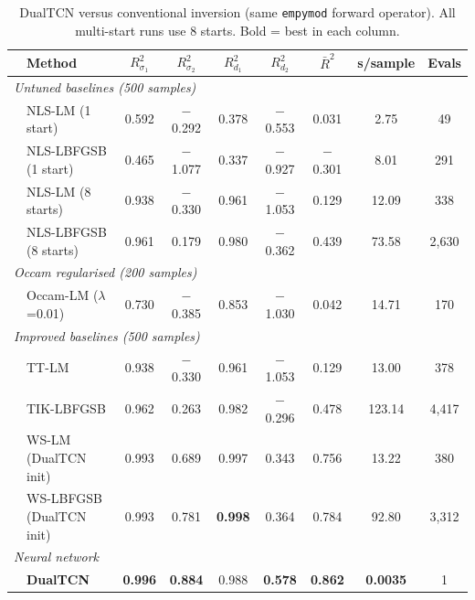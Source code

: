 \documentclass[journal]{IEEEtran}
\begin{document}
\begin{table}[t]
  \centering
  \caption{DualTCN versus conventional inversion
  (same \texttt{empymod} forward operator).  All multi-start
  runs use 8 starts.  Bold = best in each column.}
  \label{tab:supp_benchmark}
  \footnotesize
  \begin{tabular}{llccccccc}
    \toprule
    & Method & $R^2_{\sigma_1}$ & $R^2_{\sigma_2}$ & $R^2_{d_1}$
             & $R^2_{d_2}$ & $\bar{R}^2$
             & s/sample & Evals \\
    \midrule
    \multicolumn{9}{l}{\textit{Untuned baselines (500 samples)}} \\
    & NLS-LM (1 start)       & 0.592 & $-$0.292 & 0.378 & $-$0.553 & 0.031 & 2.75 & 49 \\
    & NLS-LBFGSB (1 start)   & 0.465 & $-$1.077 & 0.337 & $-$0.927 & $-$0.301 & 8.01 & 291 \\
    & NLS-LM (8 starts)      & 0.938 & $-$0.330 & 0.961 & $-$1.053 & 0.129 & 12.09 & 338 \\
    & NLS-LBFGSB (8 starts)  & 0.961 & 0.179 & 0.980 & $-$0.362 & 0.439 & 73.58 & 2{,}630 \\
    \midrule
    \multicolumn{9}{l}{\textit{Occam regularised (200 samples)}} \\
    & Occam-LM ($\lambda$=0.01) & 0.730 & $-$0.385 & 0.853 & $-$1.030 & 0.042 & 14.71 & 170 \\
    \midrule
    \multicolumn{9}{l}{\textit{Improved baselines (500 samples)}} \\
    & TT-LM                  & 0.938 & $-$0.330 & 0.961 & $-$1.053 & 0.129 & 13.00 & 378 \\
    & TIK-LBFGSB             & 0.962 & 0.263 & 0.982 & $-$0.296 & 0.478 & 123.14 & 4{,}417 \\
    & WS-LM (DualTCN init)   & 0.993 & 0.689 & 0.997 & 0.343 & 0.756 & 13.22 & 380 \\
    & WS-LBFGSB (DualTCN init) & 0.993 & 0.781 & \textbf{0.998} & 0.364 & 0.784 & 92.80 & 3{,}312 \\
    \midrule
    \multicolumn{9}{l}{\textit{Neural network}} \\
    & \textbf{DualTCN}       & \textbf{0.996} & \textbf{0.884} & 0.988 & \textbf{0.578} & \textbf{0.862} & \textbf{0.0035} & 1 \\
    \bottomrule
  \end{tabular}
\end{table}
\end{document}
